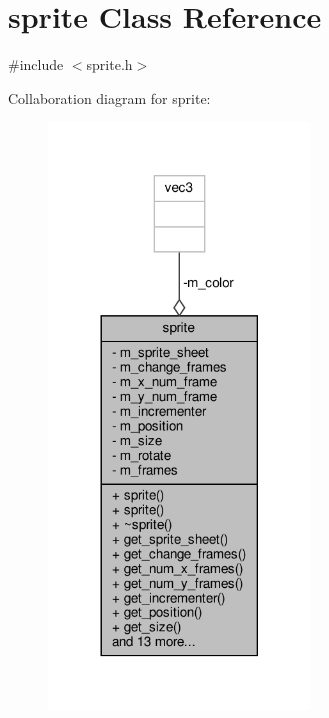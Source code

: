 \hypertarget{classsprite}{}\section{sprite Class Reference}
\label{classsprite}


{\ttfamily \#include $<$sprite.\+h$>$}



Collaboration diagram for sprite\+:
\nopagebreak
\begin{figure}[H]
\begin{center}
\leavevmode
\includegraphics[width=197pt]{classsprite__coll__graph}
\end{center}
\end{figure}

